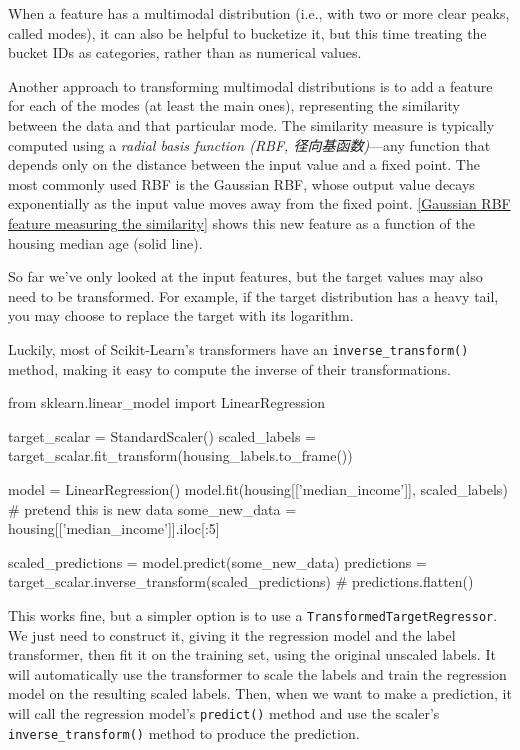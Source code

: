 When a feature has a multimodal distribution (i.e., with two or more clear peaks, called modes), it can also be helpful to bucketize it, but this time treating the bucket IDs as categories, rather than as numerical values. 

Another approach to transforming multimodal distributions is to add a feature for
each of the modes (at least the main ones), representing the similarity between the
data and that particular mode. The similarity measure is typically
computed using a \emph{radial basis function (RBF, 径向基函数)}---any function that depends only on the distance between the input value and a fixed point. The most commonly used RBF is
the Gaussian RBF, whose output value decays exponentially as the input value moves
away from the fixed point. \autoref{Gaussian RBF feature measuring the similarity} shows this new feature as a function of the housing median age (solid
line).


So far we've only looked at the input features, but the target values may also need
to be transformed. For example, if the target distribution has a heavy tail, you may
choose to replace the target with its logarithm. 

Luckily, most of Scikit-Learn's transformers have an \verb|inverse_transform()| method,
making it easy to compute the inverse of their transformations.

\begin{pyc}
from sklearn.linear_model import LinearRegression

target_scalar = StandardScaler()
scaled_labels = target_scalar.fit_transform(housing_labels.to_frame())

model = LinearRegression()
model.fit(housing[['median_income']], scaled_labels)
# pretend this is new data
some_new_data = housing[['median_income']].iloc[:5]

scaled_predictions = model.predict(some_new_data)
predictions = target_scalar.inverse_transform(scaled_predictions)
# predictions.flatten()
\end{pyc}

This works fine, but a simpler option is to use a \verb|TransformedTargetRegressor|. We
just need to construct it, giving it the regression model and the label transformer,
then fit it on the training set, using the original unscaled labels. It will automatically
use the transformer to scale the labels and train the regression model on the resulting
scaled labels. Then, when we want to make a prediction, it
will call the regression model's \verb|predict()| method and use the scaler's \verb|inverse_transform()| method to produce the prediction.


